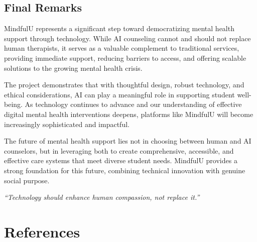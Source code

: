 \documentclass[11pt,a4paper]{article}
\begin{document}
\subsection{Final Remarks}

MindfulU represents a significant step toward democratizing mental health support through technology. While AI counseling cannot and should not replace human therapists, it serves as a valuable complement to traditional services, providing immediate support, reducing barriers to access, and offering scalable solutions to the growing mental health crisis.

The project demonstrates that with thoughtful design, robust technology, and ethical considerations, AI can play a meaningful role in supporting student well-being. As technology continues to advance and our understanding of effective digital mental health interventions deepens, platforms like MindfulU will become increasingly sophisticated and impactful.

The future of mental health support lies not in choosing between human and AI counselors, but in leveraging both to create comprehensive, accessible, and effective care systems that meet diverse student needs. MindfulU provides a strong foundation for this future, combining technical innovation with genuine social purpose.

\vspace{1cm}
\begin{center}
\textit{``Technology should enhance human compassion, not replace it.''}
\end{center}

\newpage

\section{References}
\end{document}

